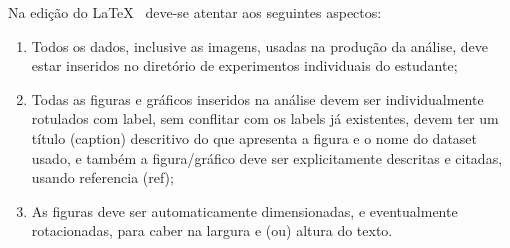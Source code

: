 Na edição do \LaTeX~ deve-se atentar aos seguintes aspectos:
\begin{enumerate}
    \item Todos os dados, inclusive as imagens, usadas na produção da análise, deve estar inseridos no diretório de experimentos individuais do estudante;
    \item Todas as figuras e gráficos inseridos na análise devem ser individualmente rotulados com label, sem conflitar com os labels já existentes, devem ter um título (caption) descritivo do que apresenta a figura e o nome do dataset usado, e também a figura/gráfico deve ser explicitamente descritas e citadas, usando referencia (ref);
    \item As figuras deve ser automaticamente dimensionadas, e eventualmente rotacionadas,  para caber na largura e (ou) altura do texto. 
\end{enumerate}